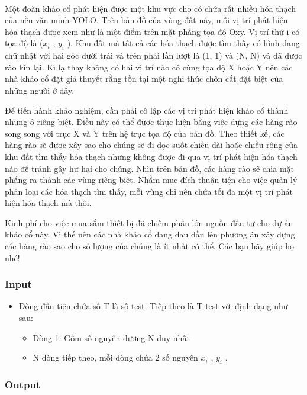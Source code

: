 

 

Một đoàn khảo cổ phát hiện được một khu vực cho có chứa rất nhiều hóa thạch của nền văn minh YOLO. Trên bản đồ của vùng đất này, mỗi vị trí phát hiện hóa thạch được xem như là một điểm trên mặt phẳng tọa độ Oxy. Vị trí thứ i có tọa độ là ($x_{i}$ , $y_{i}$ ). Khu đất mà tất cả các hóa thạch được tìm thấy có hình dạng chữ nhật với hai góc dưới trái và trên phải lần lượt là (1, 1) và (N, N) và đã được rào kín lại. Kì lạ thay không có hai vị trí nào có cùng tọa độ X hoặc Y nên các nhà khảo cổ đặt giả thuyết rằng tồn tại một nghi thức chôn cất đặt biệt của những người ở đây.

Để tiến hành khảo nghiệm, cần phải cô lập các vị trí phát hiện khảo cổ thành những ô riêng biệt. Điều này có thể được thực hiện bằng việc dựng các hàng rào song song với trục X và Y trên hệ trục tọa độ của bản đồ. Theo thiết kế, các hàng rào sẽ được xây sao cho chúng sẽ đi dọc suốt chiều dài hoặc chiều rộng của khu đất tìm thấy hóa thạch nhưng không được đi qua vị trí phát hiện hóa thạch nào để tránh gây hư hại cho chúng. Nhìn trên bản đồ, các hàng rào sẽ chia mặt phẳng ra thành các vùng riêng biệt. Nhằm mục đích thuận tiện cho việc quản lý phân loại các hóa thạch tìm thấy, mỗi vùng chỉ nên chứa tối đa một vị trí phát hiện hóa thạch mà thôi.

Kinh phí cho việc mua sắm thiết bị đã chiếm phần lớn nguồn đầu tư cho dự án khảo cổ này. Vì thế nên các nhà khảo cổ đang đau đầu lên phương án xây dựng các hàng rào sao cho số lượng của chúng là ít nhất có thể. Các bạn hãy giúp họ nhé!
\begin{itemize}
\end{itemize}

\subsubsection{Input}
\begin{itemize}
	\item Dòng đầu tiên chứa số T là số test. Tiếp theo là T test với định dạng như sau:
\begin{itemize}
	\item Dòng 1: Gồm số nguyên dương N duy nhất
	\item N dòng tiếp theo, mỗi dòng chứa 2 số nguyên $x_{i}$ , $y_{i}$ .
\end{itemize}
\end{itemize}

\subsubsection{Output}

